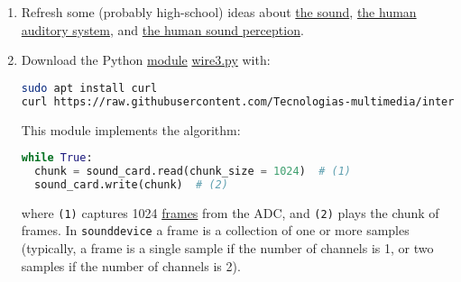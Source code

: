 \begin{enumerate}

\item Refresh some (probably high-school) ideas about
  \href{https://vicente-gonzalez-ruiz.github.io/the_sound/}{the
    sound}, \href{https://vicente-gonzalez-ruiz.github.io/human_auditory_system/}{the
    human auditory system},
    and \href{https://vicente-gonzalez-ruiz.github.io/human_sound_perception/}{the
    human sound perception}. %
  
\item Download the Python
  \href{https://docs.python.org/3/tutorial/modules.html}{module}
  \href{https://raw.githubusercontent.com/Tecnologias-multimedia/intercom/master/test/sounddevice/wire3.py}{wire3.py} with:

  \begin{lstlisting}[language=Bash]
sudo apt install curl
curl https://raw.githubusercontent.com/Tecnologias-multimedia/intercom/master/test/sounddevice/wire3.py > wire3.py
  \end{lstlisting}      
      
  This module implements the algorithm:

  \begin{lstlisting}[language=Python]
while True:
  chunk = sound_card.read(chunk_size = 1024)  # (1)
  sound_card.write(chunk)  # (2)
  \end{lstlisting}
  

  where \texttt{(1)} captures 1024
  \href{https://python-sounddevice.readthedocs.io/en/0.3.12/api.html}{frames}
  from the ADC, and \texttt{(2)} plays the chunk of frames. In
  \texttt{sounddevice} a frame is a collection of one or more samples
  (typically, a frame is a single sample if the number of channels is
  1, or two samples if the number of channels is 2).


\end{enumerate}
